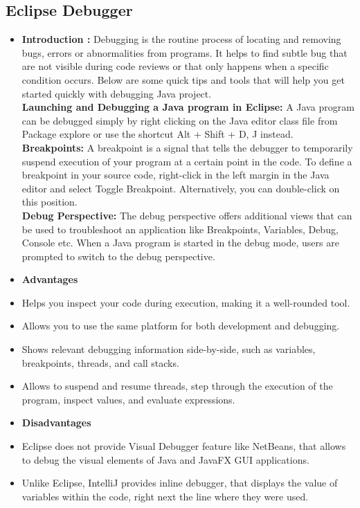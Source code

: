 \documentclass[12pt]{report}
\begin{document}
{\subsection{Eclipse Debugger}
 \noindent
 \begin{itemize}
     \item \textbf{Introduction : }Debugging is the routine process of locating and removing bugs, errors or abnormalities from programs.  It helps to find subtle bug that are not visible during code reviews or that only happens when a specific condition occurs. Below are some quick tips and tools that will help you get started quickly with debugging Java project.\\
     \textbf{Launching and Debugging a Java program in Eclipse:} A Java program can be debugged simply by right clicking on the Java editor class file from Package explore or use the shortcut Alt + Shift + D, J instead.\\
     \textbf{Breakpoints: }A breakpoint is a signal that tells the debugger to temporarily suspend execution of your program at a certain point in the code. To define a breakpoint in your source code, right-click in the left margin in the Java editor and select Toggle Breakpoint. Alternatively, you can double-click on this position.\\
     \textbf{Debug Perspective: }The debug perspective offers additional views that can be used to troubleshoot an application like Breakpoints, Variables, Debug, Console etc. When a Java program is started in the debug mode, users are prompted to switch to the debug perspective.
     \item\textbf{Advantages}
      \item Helps you inspect your code during execution, making it a well-rounded tool.
    \item Allows you to use the same platform for both development and debugging.
    \item Shows relevant debugging information side-by-side, such as variables, breakpoints, threads, and call stacks.
    \item	Allows to suspend and resume threads, step through the execution of the program, inspect values, and evaluate expressions.
     \item\textbf{Disadvantages}
      \item Eclipse does not provide Visual Debugger feature like NetBeans, that allows to debug the visual elements of Java and JavaFX GUI applications.
    \item Unlike Eclipse, IntelliJ provides inline debugger, that displays the value of variables within the code, right next the line where they were used.
 \end{itemize}

}
\end{document}
